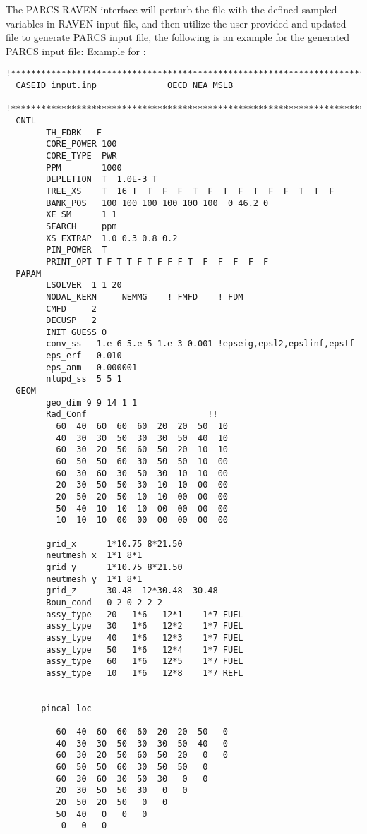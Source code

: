 The PARCS-RAVEN interface will perturb the  file with the defined sampled variables in RAVEN
input file, and then utilize the user provided  and updated  file to generate
PARCS input file, the following is an example for the generated PARCS input file:
Example for :
\begin{lstlisting}[basicstyle=\tiny]
  !******************************************************************************
  CASEID input.inp              OECD NEA MSLB
  !******************************************************************************
  CNTL
        TH_FDBK   F
        CORE_POWER 100
        CORE_TYPE  PWR
        PPM        1000
        DEPLETION  T  1.0E-3 T
        TREE_XS    T  16 T  T  F  F  T  F  T  F  T  F  F  T  T  F
        BANK_POS   100 100 100 100 100 100  0 46.2 0
        XE_SM      1 1
        SEARCH     ppm
        XS_EXTRAP  1.0 0.3 0.8 0.2
        PIN_POWER  T
        PRINT_OPT T F T T F T F F F T  F  F  F  F  F
  PARAM
        LSOLVER  1 1 20
        NODAL_KERN     NEMMG    ! FMFD    ! FDM
        CMFD     2
        DECUSP   2
        INIT_GUESS 0
        conv_ss   1.e-6 5.e-5 1.e-3 0.001 !epseig,epsl2,epslinf,epstf
        eps_erf   0.010
        eps_anm   0.000001
        nlupd_ss  5 5 1
  GEOM
        geo_dim 9 9 14 1 1
        Rad_Conf                        !!
          60  40  60  60  60  20  20  50  10
          40  30  30  50  30  30  50  40  10
          60  30  20  50  60  50  20  10  10
          60  50  50  60  30  50  50  10  00
          60  30  60  30  50  30  10  10  00
          20  30  50  50  30  10  10  00  00
          20  50  20  50  10  10  00  00  00
          50  40  10  10  10  00  00  00  00
          10  10  10  00  00  00  00  00  00

        grid_x      1*10.75 8*21.50
        neutmesh_x  1*1 8*1
        grid_y      1*10.75 8*21.50
        neutmesh_y  1*1 8*1
        grid_z      30.48  12*30.48  30.48
        Boun_cond   0 2 0 2 2 2
        assy_type   20   1*6   12*1    1*7 FUEL
        assy_type   30   1*6   12*2    1*7 FUEL
        assy_type   40   1*6   12*3    1*7 FUEL
        assy_type   50   1*6   12*4    1*7 FUEL
        assy_type   60   1*6   12*5    1*7 FUEL
        assy_type   10   1*6   12*8    1*7 REFL


       pincal_loc

          60  40  60  60  60  20  20  50   0
          40  30  30  50  30  30  50  40   0
          60  30  20  50  60  50  20   0   0
          60  50  50  60  30  50  50   0
          60  30  60  30  50  30   0   0
          20  30  50  50  30   0   0
          20  50  20  50   0   0
          50  40   0   0   0
           0   0   0



\end{lstlisting}
